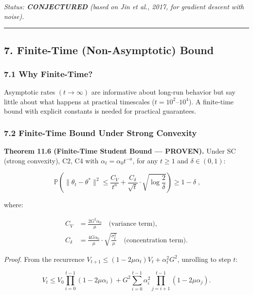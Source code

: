 \documentclass[
  12pt,
]{ctexart}
\begin{document}
\emph{Status: \textbf{CONJECTURED} (based on Jin et al., 2017, for
gradient descent with noise).}

\begin{center}\rule{0.5\linewidth}{0.5pt}\end{center}

\subsection{7. Finite-Time (Non-Asymptotic)
Bound}\label{finite-time-non-asymptotic-bound}

\subsubsection{7.1 Why Finite-Time?}\label{why-finite-time}

Asymptotic rates \((t \to \infty)\) are informative about long-run
behavior but say little about what happens at practical timescales
(\(t = 10^2\)--\(10^4\)). A finite-time bound with explicit constants is
needed for practical guarantees.

\subsubsection{7.2 Finite-Time Bound Under Strong
Convexity}\label{finite-time-bound-under-strong-convexity}

\textbf{Theorem 11.6 (Finite-Time Student Bound --- PROVEN).} Under SC
(strong convexity), C2, C4 with \(\alpha_t = \alpha_0 t^{-a}\), for any
\(t \geq 1\) and \(\delta \in (0, 1)\):

\[\boxed{\;\mathbb{P}\!\left(\|\theta_t - \theta^*\|^2 \leq \frac{C_V}{t^a} + \frac{C_{\delta}}{\sqrt{t}} \cdot \sqrt{\log\frac{2}{\delta}}\right) \geq 1 - \delta\;},\]

where:

\[\begin{aligned}
C_V &= \frac{2 G^2 \alpha_0}{\mu} \quad \text{(variance term)}, \\
C_{\delta} &= \frac{4 G \alpha_0}{\mu} \cdot \sqrt{\frac{\sigma_\xi^2}{\mu}} \quad \text{(concentration term)}.
\end{aligned}\]

\emph{Proof.} From the recurrence
\(V_{t+1} \leq (1 - 2\mu\alpha_t) V_t + \alpha_t^2 G^2\), unrolling to
step \(t\):

\[V_t \leq V_0 \prod_{i=0}^{t-1}(1 - 2\mu\alpha_i) + G^2 \sum_{i=0}^{t-1} \alpha_i^2 \prod_{j=i+1}^{t-1} (1 - 2\mu\alpha_j).\]
\end{document}
